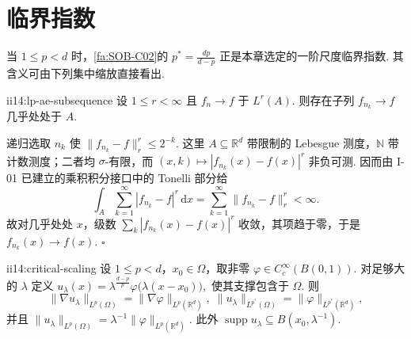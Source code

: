 \section{临界指数}\label{sec:ii14-critical-exponents}

当 \(\displaystyle1\leqslant p<d\) 时，\autoref{fa:SOB-C02}的 \(\displaystyle p^*=\frac{dp}{d-p}\) 正是本章选定的一阶尺度临界指数. 其含义可由下列集中缩放直接看出.

\begin{FALemma}{ii14:lp-ae-subsequence}
设 \(\displaystyle1\leqslant r<\infty\) 且 \(\displaystyle f_n\to f\) 于 \(\displaystyle L^r(A)\). 则存在子列 \(\displaystyle f_{n_k}\to f\) 几乎处处于 \(\displaystyle A\).
\end{FALemma}

\begin{FAProof}
递归选取 \(\displaystyle n_k\) 使 \(\displaystyle\|f_{n_k}-f\|_r^r\leqslant2^{-k}\). 这里 \(\displaystyle A\subseteq\mathbb R^d\) 带限制的 Lebesgue 测度，\(\displaystyle\mathbb N\) 带计数测度；二者均 \(\displaystyle\sigma\)-有限，而 \(\displaystyle(x,k)\mapsto|f_{n_k}(x)-f(x)|^r\) 非负可测. 因而由 I-01 已建立的乘积积分接口中的 Tonelli 部分给
\[
\int_A\sum_{k=1}^\infty|f_{n_k}-f|^r\,\mathrm{d}x
=
\sum_{k=1}^\infty\|f_{n_k}-f\|_r^r
<\infty.
\]
故对几乎处处 \(\displaystyle x\)，级数 \(\displaystyle\sum_k|f_{n_k}(x)-f(x)|^r\) 收敛，其项趋于零，于是 \(\displaystyle f_{n_k}(x)\to f(x)\).
\hfill\(\square\)
\end{FAProof}

\begin{FALemma}[B][临界缩放]{ii14:critical-scaling}
设 \(\displaystyle1\leqslant p<d\)，\(\displaystyle x_0\in\Omega\)，取非零 \(\displaystyle\varphi\in C_c^\infty(B(0,1))\). 对足够大的 \(\displaystyle\lambda\) 定义 \(\displaystyle u_\lambda(x)=\lambda^{\frac{d-p}{p}}\varphi\bigl(\lambda(x-x_0)\bigr),\)
使其支撑包含于 \(\displaystyle\Omega\). 则
\[
\|\nabla u_\lambda\|_{L^p(\Omega)}
=
\|\nabla\varphi\|_{L^p(\mathbb R^d)},
\;
\|u_\lambda\|_{L^{p^*}(\Omega)}
=
\|\varphi\|_{L^{p^*}(\mathbb R^d)},
\]
并且 \(\displaystyle\|u_\lambda\|_{L^p(\Omega)}=\lambda^{-1}\|\varphi\|_{L^p(\mathbb R^d)}\). 此外 \(\displaystyle\operatorname{supp}u_\lambda\subseteq B(x_0,\lambda^{-1})\).
\end{FALemma}

